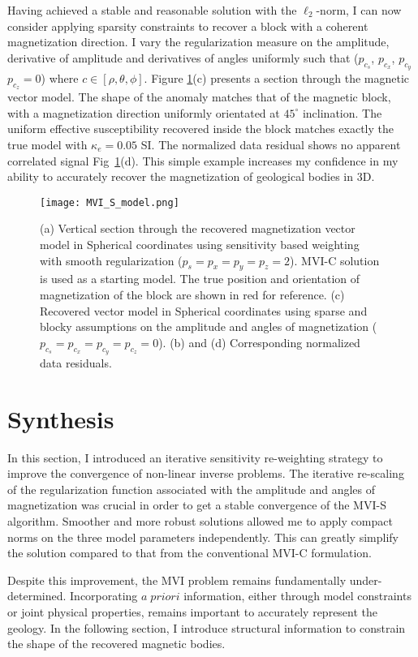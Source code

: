 Having achieved a stable and reasonable solution with the $\ell_2$-norm, I can now consider applying sparsity constraints to recover a block with a coherent magnetization direction.
I vary the regularization measure on the amplitude, derivative of amplitude and derivatives of angles uniformly such that ($p_{c_s}$, $p_{c_x}$, $p_{c_y}$ $p_{c_z} = 0$) where $c\in[\rho, \theta, \phi]$.
Figure \ref{MVI_S_model}(c) presents a section through the magnetic vector model. The shape of the anomaly matches that of the magnetic block, with a magnetization direction uniformly orientated at $45^\circ$ inclination. The uniform effective susceptibility recovered inside the block matches exactly the true model with $\kappa_e=0.05$ SI. The normalized data residual shows no apparent correlated signal Fig~\ref{MVI_S_model}(d). This simple example increases my confidence in my ability to accurately recover the magnetization of geological bodies in 3D.
\begin{figure}[h!]
\texttt{[image: MVI\_S\_model.png]}
\caption{(a) Vertical section through the recovered magnetization vector model in Spherical coordinates using sensitivity based weighting with smooth regularization ($p_s=p_x=p_y=p_z = 2$). MVI-C solution is used as a starting model. The true position and orientation of magnetization of the block are shown in red for reference. (c) Recovered vector model in Spherical coordinates using sparse and blocky assumptions on the amplitude and angles of magnetization ($p_{c_s}=p_{c_x}=p_{c_y}=p_{c_z} = 0$). (b) and (d) Corresponding normalized data residuals.}
\label{MVI_S_model}
\end{figure}

\section{Synthesis}
In this section, I introduced an iterative sensitivity re-weighting strategy to improve the convergence of non-linear inverse problems.
The iterative re-scaling of the regularization function associated with the amplitude and angles of magnetization was crucial in order to get a stable convergence of the MVI-S algorithm.
Smoother and more robust solutions allowed me to apply compact norms on the three model parameters independently. This can greatly simplify the solution compared to that from the conventional MVI-C formulation.

Despite this improvement, the MVI problem remains fundamentally under-determined. Incorporating $a \; priori$ information, either through model constraints or joint physical properties, remains important to accurately represent the geology. In the following section, I introduce structural information to constrain the shape of the recovered magnetic bodies.

\endinput

